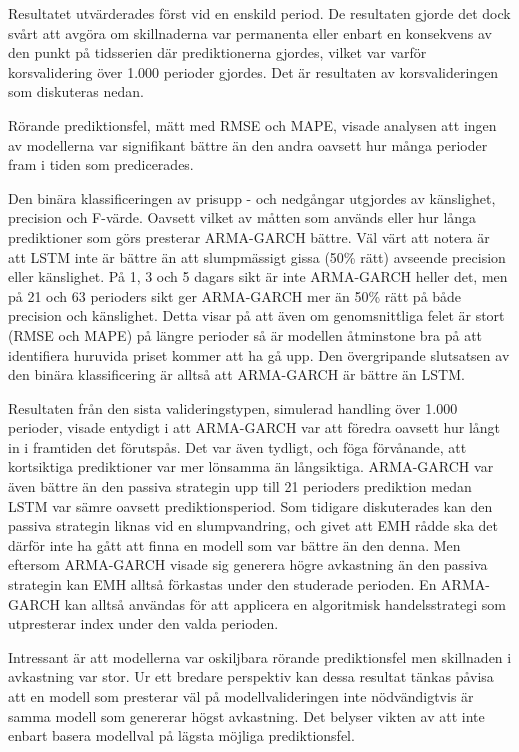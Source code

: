 \documentclass[11pt]{article}
\numberwithin{equation}{section}
\numberwithin{table}{section}
\numberwithin{figure}{section}
\begin{document}
Resultatet utvärderades först vid en enskild period. De resultaten gjorde det dock svårt att avgöra om skillnaderna var permanenta eller enbart en konsekvens av den punkt på tidsserien där prediktionerna gjordes, vilket var varför korsvalidering över 1.000 perioder gjordes. Det är resultaten av korsvalideringen som diskuteras nedan.

Rörande prediktionsfel, mätt med RMSE och MAPE, visade analysen att ingen av modellerna var signifikant bättre än den andra oavsett hur många perioder fram i tiden som predicerades.



Den binära klassificeringen av prisupp - och nedgångar utgjordes av känslighet, precision och F-värde. Oavsett vilket av måtten som används eller hur långa prediktioner som görs presterar ARMA-GARCH bättre. Väl värt att notera är att LSTM inte är bättre än att slumpmässigt gissa (50\% rätt) avseende precision eller känslighet. På 1, 3 och 5 dagars sikt är inte ARMA-GARCH heller det, men på 21 och 63 perioders sikt ger ARMA-GARCH mer än 50\% rätt på både precision och känslighet. Detta visar på att även om genomsnittliga felet är stort (RMSE och MAPE) på längre perioder så är modellen åtminstone bra på att identifiera huruvida priset kommer att ha gå upp. Den övergripande slutsatsen av den binära klassificering är alltså att ARMA-GARCH är bättre än LSTM. 

Resultaten från den sista valideringstypen, simulerad handling över 1.000 perioder, visade entydigt i att ARMA-GARCH var att föredra oavsett hur långt in i framtiden det förutspås. Det var även tydligt, och föga förvånande, att kortsiktiga prediktioner var mer lönsamma än långsiktiga. ARMA-GARCH var även bättre än den passiva strategin upp till 21 perioders prediktion medan LSTM var sämre oavsett prediktionsperiod. Som tidigare diskuterades kan den passiva strategin liknas vid en slumpvandring, och givet att EMH rådde ska det därför inte ha gått att finna en modell som var bättre än den denna. Men eftersom ARMA-GARCH visade sig generera högre avkastning än den passiva strategin kan EMH alltså förkastas under den studerade perioden. En ARMA-GARCH kan alltså användas för att applicera en algoritmisk handelsstrategi som utpresterar index under den valda perioden. 

Intressant är att modellerna var oskiljbara rörande prediktionsfel men skillnaden i avkastning var stor. Ur ett bredare perspektiv kan dessa resultat tänkas påvisa att en modell som presterar väl på modellvalideringen inte nödvändigtvis är samma modell som genererar högst avkastning. Det belyser vikten av att inte enbart basera modellval på lägsta möjliga prediktionsfel. 
\end{document}
